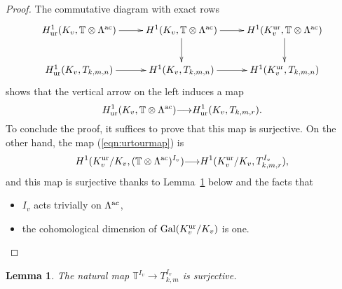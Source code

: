 \documentclass[12pt]{amsart}
\numberwithin{equation}{section}
\newtheorem{lemma}[thm]{Lemma}
\begin{document}
\begin{proof}
The commutative diagram with exact rows
$$\xymatrix{H^1_{\textup{ur}}(K_v,{\mathbb{T}}\otimes{\Lambda}^{\textup{ac}})\ar[r]& H^1(K_v,{\mathbb{T}}\otimes{\Lambda}^{\textup{ac}}) \ar[r]\ar[d]&H^1(K_v^{\textup{ur}},{\mathbb{T}}\otimes{\Lambda}^{\textup{ac}})\ar[d]\\
H^1_{\textup{ur}}(K_v,T_{k,m,n})\ar[r]&H^1(K_v,T_{k,m,n}) \ar[r]&H^1(K_v^{\textup{ur}},T_{k,m,n})
}$$
shows that the vertical arrow on the left induces a map
\begin{equation}\label{eqn:urtourmap}H^1_{\textup{ur}}(K_v,{\mathbb{T}}\otimes{\Lambda}^{\textup{ac}}){\longrightarrow} H^1_{\textup{ur}}(K_v,T_{k,m,r}).\end{equation}
To conclude the proof, it suffices to prove that this map is surjective. On the other hand, the map (\ref{eqn:urtourmap}) is
$$H^1(K_v^{\textup{ur}}/K_v, ({\mathbb{T}}\otimes{\Lambda}^{\textup{ac}})^{I_v}) {\longrightarrow} H^1(K_v^{\textup{ur}}/K_v, T_{k,m,r}^{I_v}),$$
and this map is surjective thanks to Lemma~\ref{lemma:surjective} below and the facts that
\begin{itemize}
\item $I_v$ acts trivially on ${\Lambda}^{\textup{ac}}$,
\item the cohomological dimension of $\textup{Gal}(K_v^{\textup{ur}}/K_v)$ is one.
\end{itemize}
\end{proof}
\begin{lemma}
\label{lemma:surjective}
The natural map ${\mathbb{T}}^{I_v}{\rightarrow} T_{k,m}^{I_v}$ is surjective.
\end{lemma}
\end{document}
